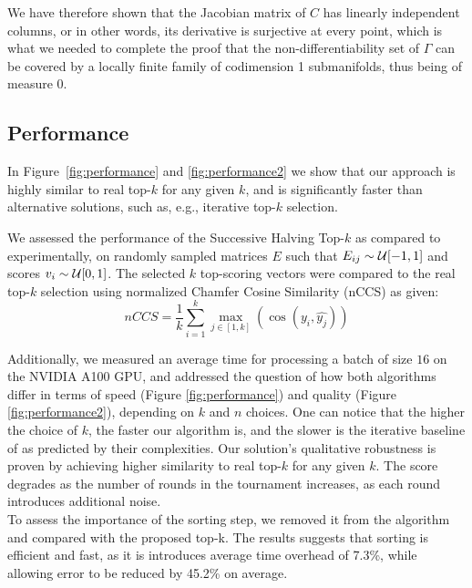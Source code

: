 \documentclass{article}
\begin{document}
We have therefore shown that the Jacobian matrix of \(C\) has linearly independent columns, or in other words, its derivative is surjective at every point, which is what we needed to complete the proof that the non-differentiability set of \(\Gamma\) can be covered by a locally finite family of codimension 1 submanifolds, thus being of measure \(0\).


\subsection{Performance}\label{topk_performance}
In Figure~\ref{fig:performance} and \ref{fig:performance2} we show that our approach is highly similar to real top-$k$ for any given $k$, and is significantly faster than alternative solutions, such as, e.g., iterative top-$k$ selection.

We assessed the performance of the Successive Halving Top-$k$ as compared to \citet{goyal2017continuous} experimentally, on randomly sampled matrices $E$ such that $\mathnormal{E_{ij}\sim \mathcal{U}}[-1,1]$ and scores $\mathnormal{v_{i}\sim \mathcal{U}}[0,1]$. The selected $k$ top-scoring vectors were compared to the real top-$k$ selection using normalized Chamfer Cosine Similarity (nCCS) as given:
\begin{equation*}
nCCS = \frac{1}{k} \sum_{i =1}^{k} \max_{j \in [1,k]}(\operatorname{cos}( y_i, \hat{y_j}))
\end{equation*}

Additionally, we measured an average time for processing a batch of size $16$ on the NVIDIA A100 GPU,
and addressed the question of how both algorithms differ in terms of speed (Figure \ref{fig:performance}) and quality (Figure \ref{fig:performance2}), depending on $k$ and $n$ choices.
One can notice that the higher the choice of $k$, the faster our algorithm is, and the slower is the iterative baseline of \citet{goyal2017continuous} as predicted by their complexities. Our solution's qualitative robustness is proven by achieving higher similarity to real top-$k$ for any given $k$. The score degrades as the number of rounds in the tournament increases, as each round introduces additional noise.\\
To assess the importance of the sorting step, we removed it from the algorithm and compared with the proposed top-k. The results suggests that sorting is efficient and fast, as it is introduces average time overhead of 7.3\%, while allowing error to be reduced by 45.2\% on average.
\end{document}
